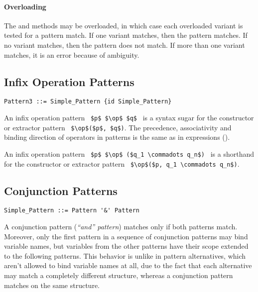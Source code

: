\paragraph{Overloading}
The  and  methods may be overloaded, in which case each overloaded variant is tested for a pattern match. If one variant matches, then the pattern matches. If no variant matches, then the pattern does not match. If more than one variant matches, it is an error because of ambiguity. 






\subsection{Infix Operation Patterns}
\label{sec:infix-operation-patterns}

\syntax\begin{lstlisting}
Pattern3 ::= Simple_Pattern {id Simple_Pattern}
\end{lstlisting}

An infix operation pattern ~\lstinline!$p$ $\op$ $q$!~ is a syntax sugar for the constructor or extractor pattern ~\lstinline!$\op$($p$, $q$)!. The precedence, associativity and binding direction of operators in patterns is the same as in expressions ().

An infix operation pattern ~\lstinline!$p$ $\op$ ($q_1 \commadots q_n$)!~ is a shorthand for the constructor or extractor pattern ~\lstinline!$\op$($p, q_1 \commadots q_n$)!.





\subsection{Conjunction Patterns}
\label{sec:conjunction-patterns}

\syntax\begin{lstlisting}
Simple_Pattern ::= Pattern '&' Pattern
\end{lstlisting}

A conjunction pattern ({\em {\normalfont ``and''} pattern}) matches only if both patterns match. Moreover, only the first pattern in a sequence of conjunction patterns may bind variable names, but variables from the other patterns have their scope extended to the following patterns. This behavior is unlike in pattern alternatives, which aren't allowed to bind variable names at all, due to the fact that each alternative may match a completely different structure, whereas a conjunction pattern matches on the same structure. 





